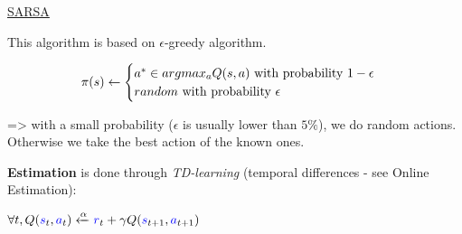 \underline{SARSA}

\vspace{5mm}

This algorithm is based on $\epsilon$-greedy algorithm.

  \begin{equation}
 \pi(s) \leftarrow
    \begin{cases}
     a^* \in argmax_a Q(s,a) $ with probability $ 1-\epsilon \\
    random $ with probability $ \epsilon
    \end{cases}
  \end{equation}

=> with a small probability ($\epsilon$ is usually lower than $5\%$), we do random actions. Otherwise we take the best action of the known ones.

\vspace{5mm}

\textbf{Estimation} is done through \textit{TD-learning} (temporal differences - see Online Estimation):

\begin{center}
$\forall t, Q(\textcolor{blue}{s}_t, \textcolor{blue}{a}_t) \xleftarrow{\alpha} \textcolor{blue}{r}_t + \gamma Q(\textcolor{blue}{s}_{t+1}, \textcolor{blue}{a}_{t+1})$
\end{center}

